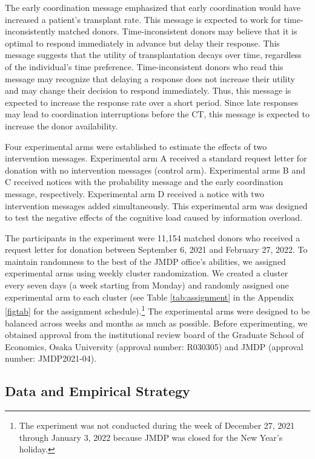 \documentclass[12pt, a4paper]{article}
\begin{document}
The early coordination message emphasized that early coordination would have increased a patient's transplant rate. This message is expected to work for time-inconsistently matched donors. Time-inconsistent donors may believe that it is optimal to respond immediately in advance but delay their response. This message suggests that the utility of transplantation decays over time, regardless of the individual's time preference. Time-inconsistent donors who read this message may recognize that delaying a response does not increase their utility and may change their decision to respond immediately. Thus, this message is expected to increase the response rate over a short period. Since late responses may lead to coordination interruptions before the CT, this message is expected to increase the donor availability.

Four experimental arms were established to estimate the effects of two intervention messages. Experimental arm A received a standard request letter for donation with no intervention messages (control arm). Experimental arms B and C received notices with the probability message and the early coordination message, respectively. Experimental arm D received a notice with two intervention messages added simultaneously. This experimental arm was designed to test the negative effects of the cognitive load caused by information overload.

The participants in the experiment were 11,154 matched donors who received a request letter for donation between September 6, 2021 and February 27, 2022. To maintain randomness to the best of the JMDP office's abilities, we assigned experimental arms using weekly cluster randomization. We created a cluster every seven days (a week starting from Monday) and randomly assigned one experimental arm to each cluster (see Table \ref{tab:assignment} in the Appendix \ref{figtab} for the assignment schedule).\footnote{The experiment was not conducted during the week of December 27, 2021 through January 3, 2022 because JMDP was closed for the New Year's holiday.} The experimental arms were designed to be balanced across weeks and months as much as possible. Before experimenting, we obtained approval from the institutional review board of the Graduate School of Economics, Osaka University (approval number: R030305) and JMDP (approval number: JMDP2021-04).

\hypertarget{data-and-empirical-strategy}{%
\subsection{Data and Empirical Strategy}\label{data-and-empirical-strategy}}
\end{document}
